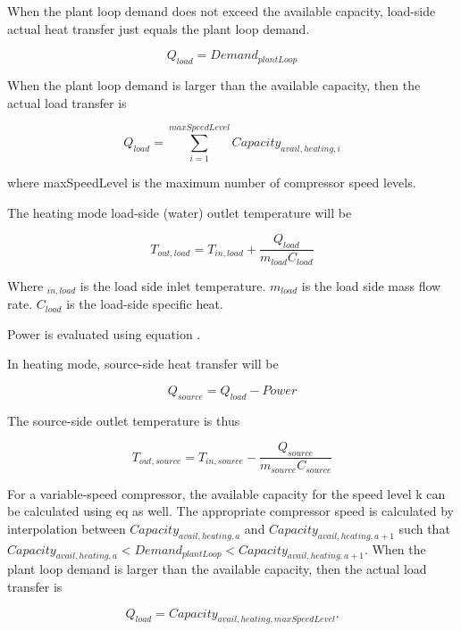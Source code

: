When the plant loop demand does not exceed the available capacity, load-side
actual heat transfer just equals the plant loop demand.

\begin{equation}
Q_{load} = Demand_{plantLoop} 
\end{equation}

When the plant loop demand is larger than the available capacity, then the
actual load transfer is

\begin{equation}
Q_{load} = \sum_{i=1}^{maxSpeedLevel} Capacity_{avail,heating,i} 
\end{equation}

where maxSpeedLevel is the maximum number of compressor speed levels.

The heating mode load-side (water) outlet temperature will be 

\begin{equation}
T_{out,load} = T_{in,load} + \frac{Q_{load}}{m_{load}C_{load}} 
\end{equation}

Where $_{in,load}$ is the load side inlet temperature. $m_{load}$ is the load
side mass flow rate. $C_{load}$ is the load-side specific heat.

Power is evaluated using equation . 

In heating mode, source-side heat transfer will be

\begin{equation}
Q_{source} = Q_{load} - Power 
\end{equation}

The source-side outlet temperature is thus

\begin{equation}
T_{out,source} = T_{in,source} - \frac{Q_{source}}{m_{source}C_{source}} 
\end{equation}

For a variable-speed compressor, the available capacity for the speed level k
can be calculated using eq as well. The appropriate compressor speed is
calculated by interpolation between $Capacity_{avail,heating,a}$ and
$Capacity_{avail,heating,a+1}$ such that $Capacity_{avail,heating,a} <
Demand_{plantLoop} < Capacity_{avail,heating,a+1}$. When the plant loop demand
is larger than the available capacity, then the actual load transfer is

\begin{equation}
Q_{load} = Capacity_{avail,heating,maxSpeedLevel} . 
\end{equation}

